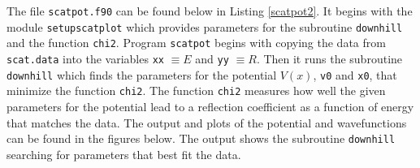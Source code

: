 \documentclass[12pt]{article}
\begin{document}
The file {\tt scatpot.f90} can be found below in Listing \ref{scatpot2}.  It begins with the module {\tt setupscatplot} which provides parameters for the subroutine {\tt downhill} and the function {\tt chi2}.  Program {\tt scatpot} begins with copying the data from {\tt scat.data} into the variables {\tt xx} $\equiv E$ and {\tt yy} $\equiv R$.  Then it runs the subroutine {\tt downhill} which finds the parameters for the potential $V(x)$, {\tt v0} and {\tt x0}, that minimize the function {\tt chi2}.  The function {\tt chi2} measures how well the given parameters for the potential lead to a reflection coefficient as a function of energy that matches the data.  The output and plots of the potential and wavefunctions can be found in the figures below.  The output shows the subroutine {\tt downhill} searching for parameters that best fit the data.
\end{document}
